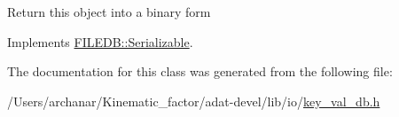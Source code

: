 Return this object into a binary form 

Implements \mbox{\hyperlink{classFILEDB_1_1Serializable_a8deaa86e108c08c863881e46cf5578ea}{F\+I\+L\+E\+D\+B\+::\+Serializable}}.



The documentation for this class was generated from the following file\+:\begin{DoxyCompactItemize}
\item 
/\+Users/archanar/\+Kinematic\+\_\+factor/adat-\/devel/lib/io/\mbox{\hyperlink{adat-devel_2lib_2io_2key__val__db_8h}{key\+\_\+val\+\_\+db.\+h}}\end{DoxyCompactItemize}
